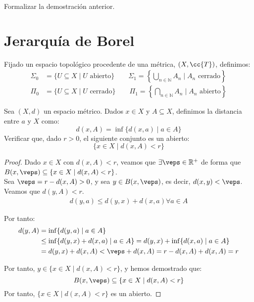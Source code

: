 \begin{ejercicio}
    Formalizar la demostración anterior.
\end{ejercicio}

\section{Jerarquía de Borel}
Fijado un espacio topológico procedente de una métrica, $(X,\cc{T})$, definimos:
\begin{align*}
    \Sigma_0 &= \{U\subseteq X \mid U \text{\ abierto}\} \qquad \Sigma_1 = \left\{\bigcup_{n\in \mathbb{N}} A_n \mid A_ n\text{\ cerrado}\right\} \\
    \Pi_0 &= \{U\subseteq X \mid U \text{\ cerrado}\} \qquad \Pi_1 = \left\{\bigcap_{n\in \mathbb{N}} A_n \mid A_n \text{\ abierto}\right\}
\end{align*}

\begin{ejercicio}
    Sea $(X,d)$ un espacio métrico. Dados $x\in X$ y $A\subseteq X$, definimos la distancia entre $a$ y $X$ como:
    \begin{equation*}
        d(x,A) = \inf\{d(x,a) \mid a\in A\}
    \end{equation*}
    Verificar que, dado $r>0$, el siguiente conjunto es un abierto:
    \begin{equation*}
        \{x\in X\mid d(x,A) < r\}
    \end{equation*}
\end{ejercicio}
\begin{proof}
    Dado $x\in X$ con $d(x,A) < r$, veamos que $\exists \veps\in \mathbb{R}^+$ de forma que $B(x,\veps) \subseteq \{x\in X\mid d(x,A) < r\}$.\\

    Sea $\veps=r-d(x,A)>0$, y sea $y\in B(x,\veps)$, es decir, $d(x,y) < \veps$. Veamos que $d(y,A) < r$.
    \begin{align*}
        d(y,a) \leq d(y,x) + d(x,a) \forall a\in A
    \end{align*}

    Por tanto:
    \begin{align*}
        d(y,A) &= \inf\{d(y,a) \mid a\in A\} \\
        &\leq \inf\{d(y,x) + d(x,a) \mid a\in A\}
        = d(y,x) + \inf\{d(x,a) \mid a\in A\} \\
        &= d(y,x) + d(x,A)< \veps + d(x,A) = r-d(x,A) + d(x,A) = r
    \end{align*}

    Por tanto, $y\in \{x\in X\mid d(x,A) < r\}$, y hemos demostrado que:
    \begin{equation*}
        B(x,\veps) \subseteq \{x\in X\mid d(x,A) < r\}
    \end{equation*}
    Por tanto, $\{x\in X\mid d(x,A) < r\}$ es un abierto.
\end{proof}


